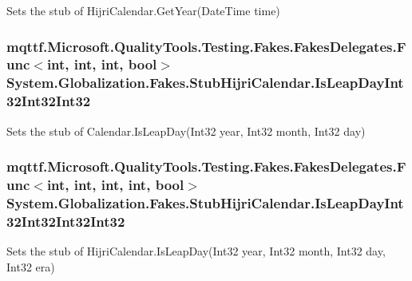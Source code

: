 Sets the stub of Hijri\-Calendar.\-Get\-Year(\-Date\-Time time)

\hypertarget{class_system_1_1_globalization_1_1_fakes_1_1_stub_hijri_calendar_ac699c2ca19599f059223ee1640838876}{
\subsubsection[{Is\-Leap\-Day\-Int32\-Int32\-Int32}]{\setlength{\rightskip}{0pt plus 5cm}mqttf.\-Microsoft.\-Quality\-Tools.\-Testing.\-Fakes.\-Fakes\-Delegates.\-Func$<$int, int, int, bool$>$ System.\-Globalization.\-Fakes.\-Stub\-Hijri\-Calendar.\-Is\-Leap\-Day\-Int32\-Int32\-Int32}}\label{class_system_1_1_globalization_1_1_fakes_1_1_stub_hijri_calendar_ac699c2ca19599f059223ee1640838876}


Sets the stub of Calendar.\-Is\-Leap\-Day(\-Int32 year, Int32 month, Int32 day)

\hypertarget{class_system_1_1_globalization_1_1_fakes_1_1_stub_hijri_calendar_a72f8c42b6d6152df9014bf0528c63c2b}{
\subsubsection[{Is\-Leap\-Day\-Int32\-Int32\-Int32\-Int32}]{\setlength{\rightskip}{0pt plus 5cm}mqttf.\-Microsoft.\-Quality\-Tools.\-Testing.\-Fakes.\-Fakes\-Delegates.\-Func$<$int, int, int, int, bool$>$ System.\-Globalization.\-Fakes.\-Stub\-Hijri\-Calendar.\-Is\-Leap\-Day\-Int32\-Int32\-Int32\-Int32}}\label{class_system_1_1_globalization_1_1_fakes_1_1_stub_hijri_calendar_a72f8c42b6d6152df9014bf0528c63c2b}


Sets the stub of Hijri\-Calendar.\-Is\-Leap\-Day(\-Int32 year, Int32 month, Int32 day, Int32 era)

